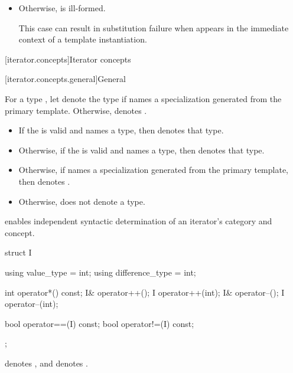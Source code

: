 \begin{addedblock}
\begin{itemize}
\item Otherwise,  is ill-formed.
  \begin{note}
  This case can result in substitution failure when 
  appears in the immediate context of a template instantiation.
  \end{note}
\end{itemize}

[iterator.concepts]{Iterator concepts}

[iterator.concepts.general]{General}

\pnum
For a type , let  denote
the type  if  names
a specialization generated from the primary template.
Otherwise,  denotes
.
\begin{itemize}
\item If the 
   is valid
  and names a type, then  denotes that
  type.
\item Otherwise, if the 
  is valid and names a type, then 
  denotes that type.
\item Otherwise, if  names a specialization generated
  from the primary template, then 
  denotes .
\item Otherwise,  does not denote a type.
\end{itemize}

\pnum
\begin{note}
 enables independent syntactic determination
of an iterator's category and concept.
\end{note}
\begin{example}
\begin{codeblock}
struct I {
  using value_type = int;
  using difference_type = int;

  int operator*() const;
  I& operator++();
  I operator++(int);
  I& operator--();
  I operator--(int);

  bool operator==(I) const;
  bool operator!=(I) const;
};
\end{codeblock}
 denotes ,
and  denotes .
\end{example}


\end{addedblock}
